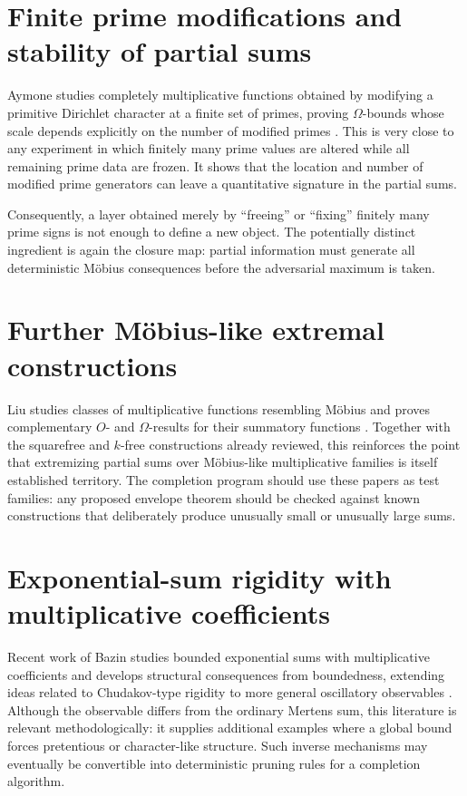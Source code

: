 \documentclass[11pt]{article}
\begin{document}
\section{Finite prime modifications and stability of partial sums}
Aymone studies completely multiplicative functions obtained by modifying a primitive Dirichlet character at a finite set of primes, proving $\Omega$-bounds whose scale depends explicitly on the number of modified primes \cite{Aymone2023Modified}. This is very close to any experiment in which finitely many prime values are altered while all remaining prime data are frozen. It shows that the location and number of modified prime generators can leave a quantitative signature in the partial sums.

Consequently, a layer obtained merely by ``freeing'' or ``fixing'' finitely many prime signs is not enough to define a new object. The potentially distinct ingredient is again the closure map: partial information must generate all deterministic Möbius consequences before the adversarial maximum is taken.

\section{Further Möbius-like extremal constructions}
Liu studies classes of multiplicative functions resembling Möbius and proves complementary $O$- and $\Omega$-results for their summatory functions \cite{Liu2022}. Together with the squarefree and $k$-free constructions already reviewed, this reinforces the point that extremizing partial sums over Möbius-like multiplicative families is itself established territory. The completion program should use these papers as test families: any proposed envelope theorem should be checked against known constructions that deliberately produce unusually small or unusually large sums.

\section{Exponential-sum rigidity with multiplicative coefficients}
Recent work of Bazin studies bounded exponential sums with multiplicative coefficients and develops structural consequences from boundedness, extending ideas related to Chudakov-type rigidity to more general oscillatory observables \cite{Bazin2025}. Although the observable differs from the ordinary Mertens sum, this literature is relevant methodologically: it supplies additional examples where a global bound forces pretentious or character-like structure. Such inverse mechanisms may eventually be convertible into deterministic pruning rules for a completion algorithm.
\end{document}
